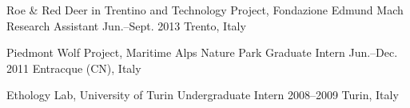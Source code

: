\begin{cventries}
  \cventry
    {Roe \& Red Deer in Trentino and Technology Project, Fondazione Edmund Mach} %
    {Research Assistant} %
    {Jun.--Sept. 2013} %
    {Trento, Italy} %
    {}

    
  \cventry
    {Piedmont Wolf Project, Maritime Alps Nature Park} %
    {Graduate Intern} %
    {Jun.--Dec. 2011} %
    {Entracque (CN), Italy} %
    {}

    
  \cventry
    {Ethology Lab, University of Turin} %
    {Undergraduate Intern} %
    {2008--2009} %
    {Turin, Italy} %
    {}

    
\end{cventries}
